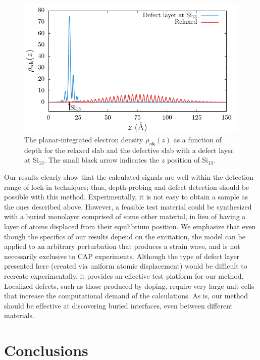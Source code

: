 \documentclass[aps,prb,10pt,showkeys,letterpaper,notitlepage,twocolumn]{revtex4-1}
\begin{document}
\begin{figure}[b]
\centering 
\includegraphics[width=\linewidth]{fig05}
\caption{
The planar-integrated electron density $\rho_{n\mathbf{k}}(z)$ as a function of
depth for the relaxed slab and the defective slab with a defect layer at
Si$_{13}$. The small black arrow indicates the $z$ position of Si$_{13}$.
}
\label{fig:defect}
\end{figure}

Our results clearly show that the calculated signals are well within the
detection range of lock-in techniques; thus, depth-probing and defect detection
should be possible with this method. Experimentally, it is not easy to obtain a
sample as the ones described above. However, a feasible test material could be
synthesized with a buried monolayer comprised of some other material, in lieu of
having a layer of atoms displaced from their equilibrium position. We emphasize
that even though the specifics of our results depend on the excitation, the
model can be applied to an arbitrary perturbation that produces a strain wave,
and is not necessarily exclusive to CAP experiments. Although the type of defect
layer presented here (created via uniform atomic displacement) would be
difficult to recreate experimentally, it provides an effective test platform for
our method. Localized defects, such as those produced by doping, require very
large unit cells that increase the computational demand of the calculations. As
is, our method should be effective at discovering buried interfaces, even
between different materials.


\section{Conclusions}\label{sec:conc}
\end{document}
